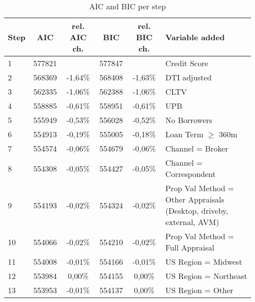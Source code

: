 \begin{table}[H]
\centering
\begin{tabular}{lccccp{4cm}}\toprule
\textbf{Step} & \textbf{AIC} & \textbf{rel. AIC ch.} & \textbf{BIC} & \textbf{rel. BIC ch.} & \textbf{Variable added}                                              \\\midrule
1             & 577821       &                       & 577847       &                       & Credit Score                                                         \\
2             & 568369       & -1,64\%               & 568408       & -1,63\%               & DTI adjusted                                                         \\
3             & 562335       & -1,06\%               & 562388       & -1,06\%               & CLTV                                                                 \\
4             & 558885       & -0,61\%               & 558951       & -0,61\%               & UPB                                                                  \\
5             & 555949       & -0,53\%               & 556028       & -0,52\%               & No Borrowers                                                         \\
6             & 554913       & -0,19\%               & 555005       & -0,18\%               & Loan Term $\geq$ 360m                                                 \\
7             & 554574       & -0,06\%               & 554679       & -0,06\%               & Channel = Broker                                                     \\
8             & 554308       & -0,05\%               & 554427       & -0,05\%               & Channel = Correspondent                                              \\
9             & 554193       & -0,02\%               & 554324       & -0,02\%               & Prop Val Method = Other Appraisals (Desktop, driveby, external, AVM) \\
10            & 554066       & -0,02\%               & 554210       & -0,02\%               & Prop Val Method = Full Appraisal                                     \\
11            & 554008       & -0,01\%               & 554166       & -0,01\%               & US Region = Midwest                                                  \\
12            & 553984       & 0,00\%                & 554155       & 0,00\%                & US Region = Northeast                                                \\
13            & 553953       & -0,01\%               & 554137       & 0,00\%                & US Region = Other                                                   \\\bottomrule
\end{tabular}
\caption{AIC and BIC per step}
\label{tab:re_AICBIC}
\end{table}

